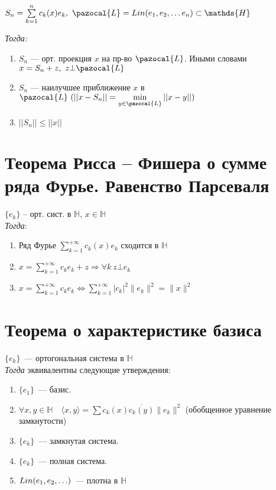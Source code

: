 \documentclass[paper=a4, fontsize=14pt]{report}
\begin{document}
    $S_n = \sum\limits_{k=1}^{n} c_k(x)e_k,\ \pazocal{L} = Lin(e_1, e_2, \ldots e_n) \subset \mathds{H}$

    \emph{Тогда:}

    \begin{enumerate}

        \item $S_n$ {{---}} орт. проекция $x$ на пр-во $\pazocal{L}$. Иными словами $x = S_n + z,\ z \bot \pazocal{L}$

        \item $S_n$ {{---}} наилучшее приближение $x$ в $\pazocal{L}\ (||x - S_n|| = \min\limits_{y \in \pazocal{L}} ||x - y||)$

        \item $||S_n|| \leqslant ||x||$

    \end{enumerate}

    \section{Теорема Рисса -- Фишера о сумме ряда Фурье. Равенство Парсеваля}
    $\{e_k\}$ -- орт. сист. в $\mathds{H}$, $x \in \mathds{H}$\\

    \emph{Тогда}:
    \begin{enumerate}
        \item Ряд Фурье $\sum\limits_{k=1}^{+\infty} c_k(x) e_k$ сходится в $\mathds{H}$
        \item $x =\sum\limits_{k=1}^{+\infty} c_k e_k + z \Rightarrow \forall k \ z \bot e_k$
        \item $x =\sum\limits_{k=1}^{+\infty} c_k e_k \Leftrightarrow \sum\limits_{k=1}^{+\infty} \vert c_k \vert^2 \|e_k\|^2=\|x\|^2$
    \end{enumerate}

    \section{Теорема о характеристике базиса}

    $\{e_k\}$~--- ортогональная система в $\mathds{H}$\\

    \emph{Тогда} эквивалентны следующие утверждения:
    \begin{enumerate}
        \item $\{e_1\}$~--- базис.
        \item $\forall x, y \in \mathds{H} \quad \langle x, y \rangle = \sum c_k(x)\overline{c_k(y)}\|e_k\|^2$ (обобщенное уравнение замкнутости)
        \item $\{e_k\}$~--- замкнутая система.
        \item $\{e_k\}$~--- полная система.
        \item $Lin(e_1, e_2, \mathellipsis)$~--- плотна в $\mathds{H}$
    \end{enumerate}
\end{document}

